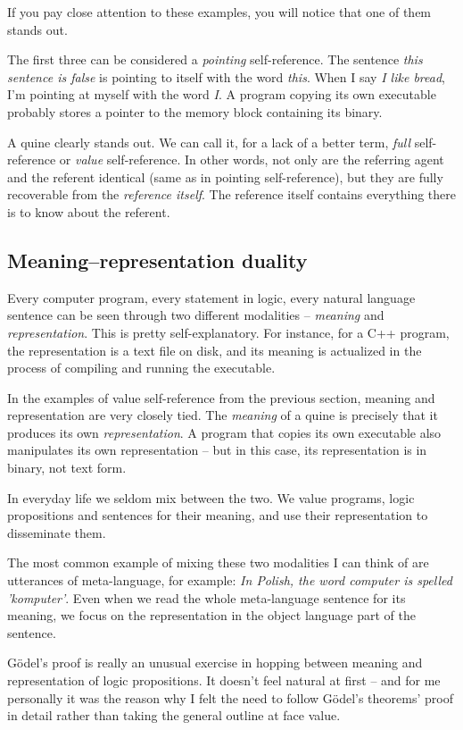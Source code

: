 \documentclass{article}
\begin{document}
If you pay close attention to these examples, you will notice that one of them stands out.

The first three can be considered a \textit{pointing} self-reference. The sentence \textit{this
sentence is false} is pointing to itself with the word \textit{this}. When I say \textit{I
like bread}, I'm pointing at myself with the word \textit{I}. A program copying its own executable
probably stores a pointer to the memory block containing its binary.

A quine clearly stands out. We can call it, for a lack of a better term, \textit{full}
self-reference or \textit{value} self-reference. In other words, not only are the referring
agent and the referent identical (same as in pointing self-reference), but they are fully
recoverable from the \textit{reference itself}. The reference itself contains everything there
is to know about the referent.

\subsection{Meaning--representation duality}

Every computer program, every statement in logic, every natural language sentence
can be seen through two different modalities -- \textit{meaning} and \textit{representation}.
This is pretty self-explanatory. For instance, for a C++ program, the representation is a text
file on disk, and its meaning is actualized in the process of compiling and running the
executable.

In the examples of value self-reference from the previous section, meaning and representation
are very closely tied. The \textit{meaning} of a quine is precisely that it produces its own
\textit{representation}. A program that copies its own executable also manipulates its own
representation -- but in this case, its representation is in binary, not text form.

In everyday life we seldom mix between the two. We value programs, logic propositions
and sentences for their meaning, and use their representation to disseminate them.

The most common example of mixing these two modalities I can think of are utterances of
meta-language, for example: \textit{In Polish, the word computer is spelled 'komputer'}.
Even when we read the whole meta-language sentence for its meaning, we focus on the
representation in the object language part of the sentence.

Gödel's proof is really an unusual exercise in hopping between meaning and representation
of logic propositions. It doesn't feel natural at first -- and for me personally it was
the reason why I felt the need to follow Gödel's theorems' proof in detail rather than
taking the general outline at face value.
\end{document}
